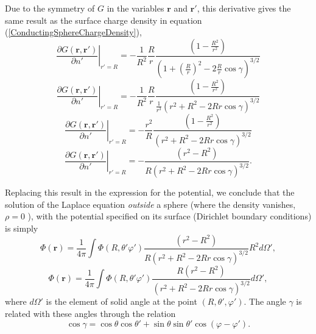 Due to the symmetry of $G$ in the variables $\textbf{r}$ and $\textbf{r}'$, this derivative gives the same result as the surface charge density in equation (\ref{ConductingSphereChargeDensity}),
\begin{equation}
\left. \frac{\partial G  (\textbf{r}, \textbf{r}')}{\partial n'} \right|_{r'=R} = - \frac{1}{R^2 } \frac{R}{r} \frac{ \left(  1- \frac{ R^2}{r^2  }  \right) }{ \left( 1+ \left(\frac{R}{r}\right)^2 - 2 \frac{R}{r} \cos \gamma \right)^{3/2} }
\end{equation}
\begin{equation}
\left. \frac{\partial G  (\textbf{r}, \textbf{r}')}{\partial n'} \right|_{r'=R} = - \frac{1}{R^2 } \frac{R}{r} \frac{ \left(  1- \frac{ R^2}{r^2  }  \right) }{ \frac{1}{r^3} \left( r^2+ R^2- 2 Rr \cos \gamma \right)^{3/2} }
\end{equation}
\begin{equation}
\left. \frac{\partial G  (\textbf{r}, \textbf{r}')}{\partial n'} \right|_{r'=R} = - \frac{r^2 }{R } \frac{ \left(  1- \frac{ R^2}{r^2  }  \right) }{  \left( r^2+ R^2- 2 Rr \cos \gamma \right)^{3/2} }
\end{equation}
\begin{equation}
\left. \frac{\partial G  (\textbf{r}, \textbf{r}')}{\partial n'} \right|_{r'=R} = -  \frac{ \left(  r^2- R^2 \right) }{ R \left( r^2+ R^2- 2 Rr \cos \gamma \right)^{3/2} }.
\end{equation}

Replacing this result in the expression for the potential, we conclude that the solution of the Laplace equation \textit{outside} a sphere (where the density vanishes, $\rho = 0$ ), with the potential specified on its surface (Dirichlet boundary conditions) is simply
\begin{equation}
\Phi (\textbf{r}) = \frac{1}{4 \pi} \int \Phi (R, \theta ' \varphi ')  \frac{ \left(  r^2- R^2 \right) }{ R \left( r^2+ R^2- 2 Rr \cos \gamma \right)^{3/2} } R^2 d \Omega ', \label{eq:SpherePotential}
\end{equation}
\begin{equation}
\Phi (\textbf{r}) = \frac{1}{4 \pi} \int \Phi (R, \theta ' \varphi ')  \frac{R  \left(  r^2- R^2 \right) }{  \left( r^2+ R^2- 2 Rr \cos \gamma \right)^{3/2} } d \Omega ', \label{eq:SpherePotential}
\end{equation}
where $d\Omega '$ is the element of solid angle at the point $(R, \theta ', \varphi ')$. The angle $\gamma$ is related with these angles through the relation
\begin{equation}
\cos \gamma = \cos \theta \cos \theta ' + \sin \theta  \sin \theta ' \cos (\varphi - \varphi ').
\end{equation}

